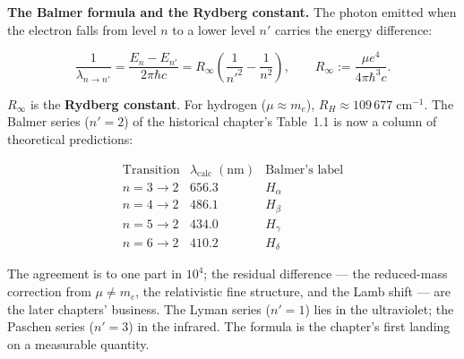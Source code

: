 \medskip\noindent\textbf{The Balmer formula and the Rydberg constant.} The photon emitted when the electron falls from level $n$ to a lower level $n'$ carries the energy difference:
\begin{linenomath}
\begin{equation}
\boxed{\;
\frac{1}{\lambda_{n\to n'}}
= \frac{E_n - E_{n'}}{2\pi\hbar c}
= R_\infty\left(\frac{1}{n'^{2}} - \frac{1}{n^{2}}\right),
\qquad
R_\infty := \frac{\mu e^4}{4\pi\hbar^3 c} .
\;}
\label{eq:balmer-formula}
\end{equation}
\end{linenomath}
$R_\infty$ is the \textbf{Rydberg constant}. For hydrogen ($\mu \approx m_e$), $R_H \approx 109\,677\;\text{cm}^{-1}$. The Balmer series ($n'=2$) of the historical chapter's Table~1.1 is now a column of theoretical predictions:
\begin{linenomath}
\begin{equation*}
\begin{array}{c|c|c}
\text{Transition} & \lambda_{\text{calc}}\;(\text{nm}) & \text{Balmer's label} \\ \hline
n=3\to2 & 656.3 & H_\alpha \\
n=4\to2 & 486.1 & H_\beta \\
n=5\to2 & 434.0 & H_\gamma \\
n=6\to2 & 410.2 & H_\delta
\end{array}
\end{equation*}
\end{linenomath}
The agreement is to one part in $10^4$; the residual difference --- the reduced-mass correction from $\mu \neq m_e$, the relativistic fine structure, and the Lamb shift --- are the later chapters' business. The Lyman series ($n'=1$) lies in the ultraviolet; the Paschen series ($n'=3$) in the infrared. The formula is the chapter's first landing on a measurable quantity.

